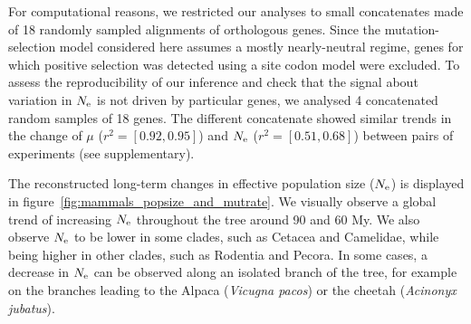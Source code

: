\documentclass{article}
\begin{document}
For computational reasons, we restricted our analyses to small concatenates made of 18 randomly sampled alignments of orthologous genes.
Since the mutation-selection model considered here assumes a mostly nearly-neutral regime, genes for which positive selection was detected using a site codon model were excluded.
To assess the reproducibility of our inference and check that the signal about variation in $N_{\text{e}}$ is not driven by particular genes, we analysed 4 concatenated random samples of 18 genes.
The different concatenate showed similar trends in the change of $\mu$ ($r^2=[0.92,0.95]$) and $N_{\text{e}}$ ($r^2=[0.51,0.68]$) between pairs of experiments (see supplementary).

The reconstructed long-term changes in {effective population size} ($N_{\text{e}}$) is displayed in figure~\ref{fig:mammals_popsize_and_mutrate}.
We visually observe a global trend of increasing $N_{\text{e}}$ throughout the tree around 90 and 60 My.
We also observe $N_{\text{e}}$ to be lower in some clades, such as Cetacea and Camelidae, while being higher in other clades, such as Rodentia and Pecora.
In some cases, a decrease in $N_{\text{e}}$ can be observed along an isolated branch of the tree, for example on the branches leading to the Alpaca (\textit{Vicugna pacos}) or the cheetah (\textit{Acinonyx jubatus}).
\end{document}
